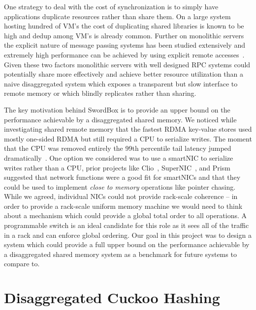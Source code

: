 \documentclass[12pt]{ucsddissertation}
\newcommand{\sword}{SwordBox}
\begin{document}
One strategy to deal with the cost of synchronization is to simply have applications duplicate
resources rather than share them. On a large system hosting hundred of VM's the cost of duplicating
shared libraries is known to be high and dedup among VM's is already common.  Further on monolithic
servers the explicit nature of message passing systems has been studied extensively and extremely
high performance can be achieved by using explicit remote accesses~\cite{herd, erpc}. Given these
two factors monolithic servers with well designed RPC systems could potentially share more
effectively and achieve better resource utilization than a naive disaggregated system which exposes
a transparent but slow interface to remote memory or which blindly replicates rather than sharing.

The key motivation behind {\sword} is to provide an upper bound on the performance achievable by a
disaggregated shared memory. We noticed while investigating shared remote memory that the fastest
RDMA key-value stores used mostly one-sided RDMA but still required a CPU to serialize writes. The
moment that the CPU was removed entirely the 99th percentile tail latency jumped
dramatically~\cite{clover}. One option we considered was to use a smartNIC to serialize writes
rather than a CPU, prior projects like Clio~\cite{clio}, SuperNIC~\cite{supernic}, and
Prism~\cite{prism} suggested that network functions were a good fit for smartNICs and that they
could be used to implement \textit{close to memory} operations like pointer chasing. While we
agreed, individual NICs could not provide rack-scale coherence -- in order to provide a rack-scale
uniform memory machine we would need to think about a mechanism which could provide a global total
order to all operations. A programmable switch is an ideal candidate for this role as it sees all of
the traffic in a rack and can enforce global ordering. Our goal in this project was to design a
system which could provide a full upper bound on the performance achievable by a disaggregated
shared memory system as a benchmark for future systems to compare to.











\chapter{Disaggregated Cuckoo Hashing}
\label{chap:rcuckoo}
\end{document}
